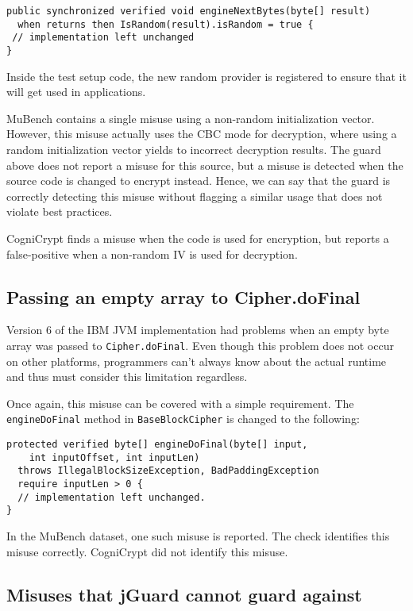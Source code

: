 \documentclass{article}
\begin{document}
\begin{lstlisting}[style=jGuard]
public synchronized verified void engineNextBytes(byte[] result)
  when returns then IsRandom(result).isRandom = true {
 // implementation left unchanged
}
\end{lstlisting}

Inside the test setup code, the new random provider is registered to ensure that
it will get used in applications.

MuBench contains a single misuse using a non-random initialization vector.
However, this misuse actually uses the CBC mode for decryption, where using a random
initialization vector yields to incorrect decryption results.
The guard above does not report a misuse for this source, but a misuse is detected when the source code
is changed to encrypt instead.
Hence, we can say that the guard is correctly detecting this misuse without flagging a
similar usage that does not violate best practices.

CogniCrypt finds a misuse when the code is used for encryption, but reports a false-positive
when a non-random IV is used for decryption.

\subsection{Passing an empty array to Cipher.doFinal}

Version 6 of the IBM JVM implementation had problems when an empty byte array was
passed to \texttt{Cipher.do\-Final}.
Even though this problem does not occur on other platforms, programmers can't always know
about the actual runtime and thus must consider this limitation regardless.

Once again, this misuse can be covered with a simple requirement.
The \texttt{engineDoFinal} method in \texttt{BaseBlockCipher} is changed to the
following:

\begin{lstlisting}[style=jGuard]
protected verified byte[] engineDoFinal(byte[] input,
    int inputOffset, int inputLen)
  throws IllegalBlockSizeException, BadPaddingException
  require inputLen > 0 {
  // implementation left unchanged.
}
\end{lstlisting}

In the MuBench dataset, one such misuse is reported.
The check identifies this misuse correctly.
CogniCrypt did not identify this misuse.

\subsection{Misuses that jGuard cannot guard against}
\end{document}
